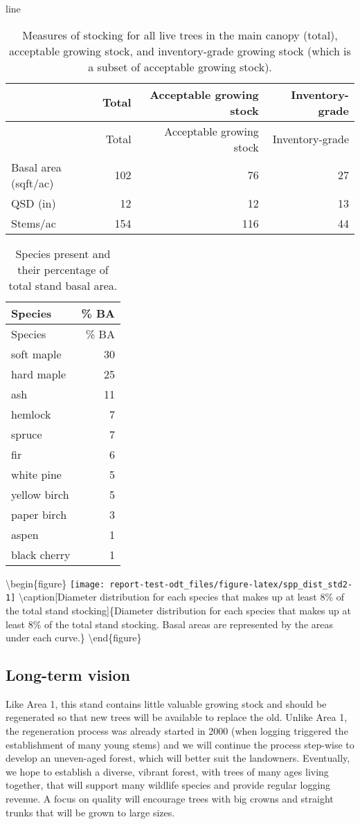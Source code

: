 \documentclass[]{tufte-handout}
\begin{document}
line

\begin{longtable}[]{@{}lrrr@{}}
\caption{Measures of stocking for all live trees in the main canopy
(total), acceptable growing stock, and inventory-grade growing stock
(which is a subset of acceptable growing stock).}\tabularnewline
\toprule
& Total & Acceptable growing stock & Inventory-grade\tabularnewline
\midrule
\endfirsthead
\toprule
& Total & Acceptable growing stock & Inventory-grade\tabularnewline
\midrule
\endhead
Basal area (sqft/ac) & 102 & 76 & 27\tabularnewline
QSD (in) & 12 & 12 & 13\tabularnewline
Stems/ac & 154 & 116 & 44\tabularnewline
\bottomrule
\end{longtable}

\begin{longtable}[]{@{}lr@{}}
\caption{Species present and their percentage of total stand basal
area.}\tabularnewline
\toprule
Species & \% BA\tabularnewline
\midrule
\endfirsthead
\toprule
Species & \% BA\tabularnewline
\midrule
\endhead
soft maple & 30\tabularnewline
hard maple & 25\tabularnewline
ash & 11\tabularnewline
hemlock & 7\tabularnewline
spruce & 7\tabularnewline
fir & 6\tabularnewline
white pine & 5\tabularnewline
yellow birch & 5\tabularnewline
paper birch & 3\tabularnewline
aspen & 1\tabularnewline
black cherry & 1\tabularnewline
\bottomrule
\end{longtable}

\textbackslash{}begin\{figure\}
\texttt{[image: report-test-odt\_files/figure-latex/spp\_dist\_std2-1]}
\textbackslash{}caption{[}Diameter distribution for each species that
makes up at least 8\% of the total stand stocking{]}\{Diameter
distribution for each species that makes up at least 8\% of the total
stand stocking. Basal areas are represented by the areas under each
curve.\}\label{fig:spp_dist_std2} \textbackslash{}end\{figure\}

\subsection{Long-term vision}\label{long-term-vision-1}

Like Area 1, this stand contains little valuable growing stock and
should be regenerated so that new trees will be available to replace the
old. Unlike Area 1, the regeneration process was already started in 2000
(when logging triggered the establishment of many young stems) and we
will continue the process step-wise to develop an uneven-aged forest,
which will better suit the landowners. Eventually, we hope to establish
a diverse, vibrant forest, with trees of many ages living together, that
will support many wildlife species and provide regular logging revenue.
A focus on quality will encourage trees with big crowns and straight
trunks that will be grown to large sizes.
\end{document}
